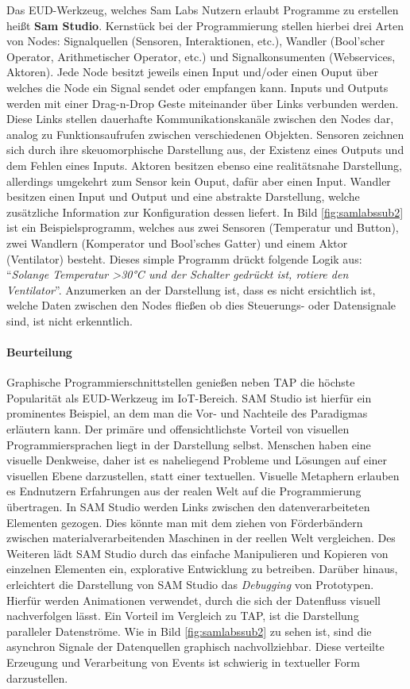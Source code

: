 Das \ac{EUD}-Werkzeug, welches Sam Labs Nutzern erlaubt Programme zu erstellen heißt \textbf{Sam Studio}. Kernstück bei der Programmierung stellen hierbei drei Arten von Nodes: Signalquellen (Sensoren, Interaktionen, etc.), Wandler (Bool'scher Operator, Arithmetischer Operator, etc.) und Signalkonsumenten (Webservices, Aktoren). Jede Node besitzt jeweils einen Input und/oder einen Ouput über welches die Node ein Signal sendet oder empfangen kann. Inputs und Outputs werden mit einer Drag-n-Drop Geste miteinander über Links verbunden werden. Diese Links stellen dauerhafte Kommunikationskanäle zwischen den Nodes dar, analog zu Funktionsaufrufen zwischen verschiedenen Objekten. Sensoren zeichnen sich durch ihre skeuomorphische Darstellung aus, der Existenz eines Outputs und dem Fehlen eines Inputs. Aktoren besitzen ebenso eine realitätsnahe Darstellung, allerdings umgekehrt zum Sensor kein Ouput, dafür aber einen Input. Wandler besitzen einen Input und Output und eine abstrakte Darstellung, welche zusätzliche Information zur Konfiguration dessen liefert. In Bild \ref{fig:samlabssub2} ist ein Beispielsprogramm, welches aus zwei Sensoren (Temperatur und Button), zwei Wandlern (Komperator und Bool'sches Gatter) und einem Aktor (Ventilator) besteht. Dieses simple Programm drückt folgende Logik aus: "`\textit{Solange Temperatur >30°C und der Schalter gedrückt ist, rotiere den Ventilator}"'. Anzumerken an der Darstellung ist, dass es nicht ersichtlich ist, welche Daten zwischen den Nodes fließen ob dies Steuerungs- oder Datensignale sind, ist nicht erkenntlich. 

\paragraph{Beurteilung} Graphische Programmierschnittstellen genießen neben \ac{TAP} die höchste Popularität als \ac{EUD}-Werkzeug im \ac{IoT}-Bereich. SAM Studio ist hierfür ein prominentes Beispiel, an dem man die Vor- und Nachteile des Paradigmas erläutern kann. Der primäre und offensichtlichste Vorteil von visuellen Programmiersprachen liegt in der Darstellung selbst. Menschen haben eine visuelle Denkweise, daher ist es naheliegend Probleme und Lösungen auf einer visuellen Ebene darzustellen, statt einer textuellen. Visuelle Metaphern erlauben es Endnutzern Erfahrungen aus der realen Welt auf die Programmierung übertragen. In SAM Studio werden Links zwischen den datenverarbeiteten Elementen gezogen. Dies könnte man mit dem ziehen von Förderbändern zwischen materialverarbeitenden Maschinen in der reellen Welt vergleichen. Des Weiteren lädt SAM Studio durch das einfache Manipulieren und Kopieren von einzelnen Elementen ein, explorative Entwicklung zu betreiben. Darüber hinaus, erleichtert die Darstellung von SAM Studio das \textit{Debugging} von Prototypen. Hierfür werden Animationen verwendet, durch die sich der Datenfluss visuell nachverfolgen lässt. Ein Vorteil im Vergleich zu \ac{TAP}, ist die Darstellung paralleler Datenströme. Wie in Bild \ref{fig:samlabssub2} zu sehen ist, sind die asynchron Signale der Datenquellen graphisch nachvollziehbar. Diese verteilte Erzeugung und Verarbeitung von Events ist schwierig in textueller Form darzustellen. 

